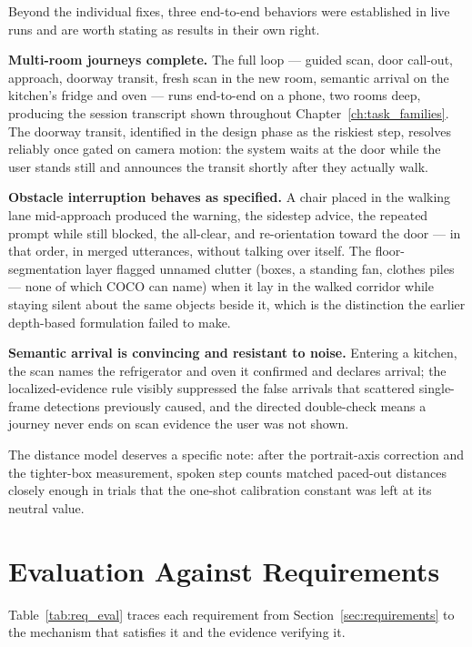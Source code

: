 Beyond the individual fixes, three end-to-end behaviors were established in live
runs and are worth stating as results in their own right.

\textbf{Multi-room journeys complete.} The full loop --- guided scan, door
call-out, approach, doorway transit, fresh scan in the new room, semantic arrival
on the kitchen's fridge and oven --- runs end-to-end on a phone, two rooms deep,
producing the session transcript shown throughout
Chapter~\ref{ch:task_families}. The doorway transit, identified in the design
phase as the riskiest step, resolves reliably once gated on camera motion: the
system waits at the door while the user stands still and announces the transit
shortly after they actually walk.

\textbf{Obstacle interruption behaves as specified.} A chair placed in the walking
lane mid-approach produced the warning, the sidestep advice, the repeated prompt
while still blocked, the all-clear, and re-orientation toward the door --- in that
order, in merged utterances, without talking over itself. The floor-segmentation
layer flagged unnamed clutter (boxes, a standing fan, clothes piles --- none of
which COCO can name) when it lay in the walked corridor while staying silent about
the same objects beside it, which is the distinction the earlier depth-based
formulation failed to make.

\textbf{Semantic arrival is convincing and resistant to noise.} Entering a
kitchen, the scan names the refrigerator and oven it confirmed and declares
arrival; the localized-evidence rule visibly suppressed the false arrivals that
scattered single-frame detections previously caused, and the directed double-check
means a journey never ends on scan evidence the user was not shown.

The distance model deserves a specific note: after the portrait-axis correction
and the tighter-box measurement, spoken step counts matched paced-out distances
closely enough in trials that the one-shot calibration constant was left at its
neutral value.

\section{Evaluation Against Requirements}
\label{sec:req_eval}

Table~\ref{tab:req_eval} traces each requirement from
Section~\ref{sec:requirements} to the mechanism that satisfies it and the evidence
verifying it.

